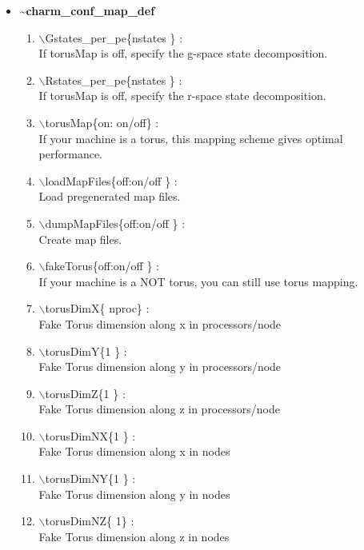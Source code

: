 \documentclass[12pt]{article}
\begin{document}
\begin{itemize}
\clearpage
\huge
\item []{\bf \~{ }charm\_conf\_map\_def}
\begin{enumerate}
  \vspace{0.15in} \Large
  \item $\backslash$Gstates\_per\_pe\{nstates \} : \\    \large
  If torusMap is off, specify the g-space state decomposition.
  \vspace{0.15in} \Large
  \item $\backslash$Rstates\_per\_pe\{nstates \} : \\    \large
  If torusMap is off, specify the r-space state decomposition.
  \vspace{0.15in} \Large
  \item $\backslash$torusMap\{on: on/off\} : \\    \large
  If your machine is a torus, this mapping scheme gives optimal performance.
  \vspace{0.15in} \Large
  \item $\backslash$loadMapFiles\{off:on/off \} : \\    \large
  Load pregenerated map files.
  \vspace{0.15in} \Large
  \item $\backslash$dumpMapFiles\{off:on/off \} : \\    \large
  Create map files.
  \vspace{0.15in} \Large
  \item $\backslash$fakeTorus\{off:on/off \} : \\    \large
  If your machine is a NOT torus, you can still use torus mapping.
  \vspace{0.15in} \Large
  \item $\backslash$torusDimX\{ nproc\} : \\    \large
  Fake Torus dimension along x in processors/node
  \vspace{0.15in} \Large
  \item $\backslash$torusDimY\{1 \} : \\    \large
  Fake Torus dimension along y in processors/node
  \vspace{0.15in} \Large
  \item $\backslash$torusDimZ\{1 \} : \\    \large
  Fake Torus dimension along z in processors/node
  \vspace{0.15in} \Large
  \item $\backslash$torusDimNX\{1 \} : \\    \large
  Fake Torus dimension along x in nodes
  \vspace{0.15in} \Large
  \item $\backslash$torusDimNY\{1 \} : \\    \large
  Fake Torus dimension along y in nodes
  \vspace{0.15in} \Large
  \item $\backslash$torusDimNZ\{ 1\} : \\    \large
  Fake Torus dimension along z in nodes
\end{enumerate}


\end{itemize}
\end{document}
